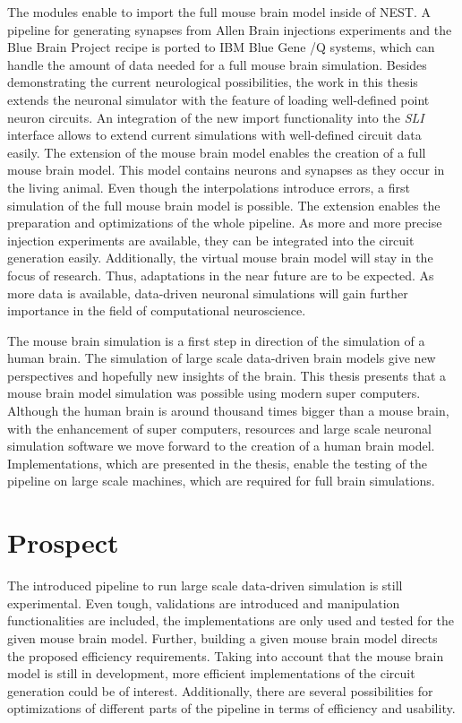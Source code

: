 The modules enable to import the full mouse brain model inside of NEST.
A pipeline for generating synapses from Allen Brain injections experiments and the Blue Brain Project recipe
is ported to IBM Blue Gene /Q systems, which can handle the amount of data needed for a full mouse brain simulation.
Besides demonstrating the current neurological possibilities, the work in this thesis extends the neuronal simulator with the feature of loading well-defined
point neuron circuits. An integration of the new import functionality into the \emph{SLI}
interface allows to extend current simulations with well-defined circuit data easily.
The extension of the mouse brain model enables the creation of a full mouse brain model.
This model contains neurons and synapses as they occur in the living animal.
Even though the interpolations introduce errors, a first simulation of the full mouse brain model is possible.
The extension enables the preparation and optimizations of the whole pipeline.
As more and more precise injection experiments are available, they can be integrated into the circuit generation easily.
Additionally, the virtual mouse brain model will stay in the focus of research.
Thus, adaptations in the near future are to be expected.
As more data is available, data-driven neuronal simulations will gain further importance in the field of computational neuroscience.

The mouse brain simulation is a first step in direction of the simulation of a human brain. The simulation of large scale data-driven brain models give new perspectives and hopefully new insights of the brain.
This thesis presents that a mouse brain model simulation was possible using modern super computers. Although the human brain is around thousand times bigger than a mouse brain, with the enhancement of super computers, resources and large scale neuronal simulation software we move forward to the creation of a human brain model. 
Implementations, which are presented in the thesis, enable the testing of the pipeline on
large scale machines, which are required for full brain simulations.



\chapter{Prospect}
The introduced pipeline to run large scale data-driven simulation is still experimental.
Even tough, validations are introduced and manipulation functionalities are included, the 
implementations are only used and tested for the given mouse brain model. Further, building a given 
mouse brain model directs the proposed efficiency requirements. Taking into account that
the mouse brain model is still in development, more efficient implementations of the 
circuit generation could be of interest.
Additionally, there are several possibilities for optimizations of different parts of the pipeline in terms of efficiency and usability.

